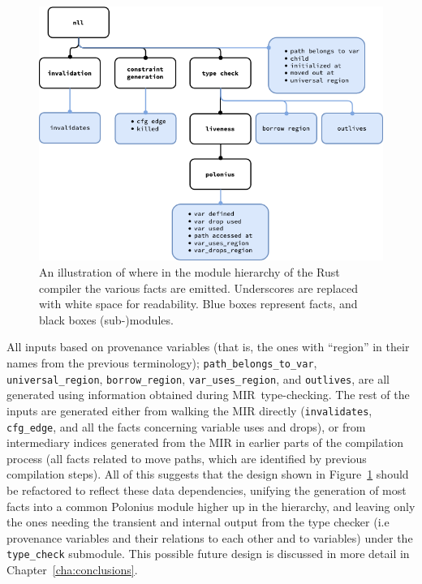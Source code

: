 \documentclass[11pt,a4paper,twoside,openany]{report}
\begin{document}
\begin{figure}
  \includegraphics[width=0.9\linewidth]{Graphs/rustc-module-structure}
  \caption[Polonius In Rust's Module Hierarchy]{An illustration of where in the
    module hierarchy of the Rust compiler the various facts are emitted.
    Underscores are replaced with white space for readability. Blue boxes
    represent facts, and black boxes (sub-)modules.}
  \label{fig:fact-module-hierarchy}
\end{figure}

All inputs based on provenance variables (that is, the ones with ``region'' in
their names from the previous terminology); \texttt{path\_belongs\_to\_var},
\texttt{universal\_region}, \texttt{borrow\_region}, \texttt{var\_uses\_region},
and \texttt{outlives}, are all generated using information obtained during
MIR~type-checking. The rest of the inputs are generated either from walking the
MIR directly (\texttt{invalidates}, \texttt{cfg\_edge}, and all the facts
concerning variable uses and drops), or from intermediary indices generated from
the MIR in earlier parts of the compilation process (all facts related to move
paths, which are identified by previous compilation steps). All of this suggests
that the design shown in Figure~\ref{fig:fact-module-hierarchy} should be
refactored to reflect these data dependencies, unifying the generation of most
facts into a common Polonius module higher up in the hierarchy, and leaving only
the ones needing the transient and internal output from the type checker (i.e
provenance variables and their relations to each other and to variables) under
the \texttt{type\_check} submodule. This possible future design is discussed in
more detail in Chapter~\ref{cha:conclusions}.
\end{document}
